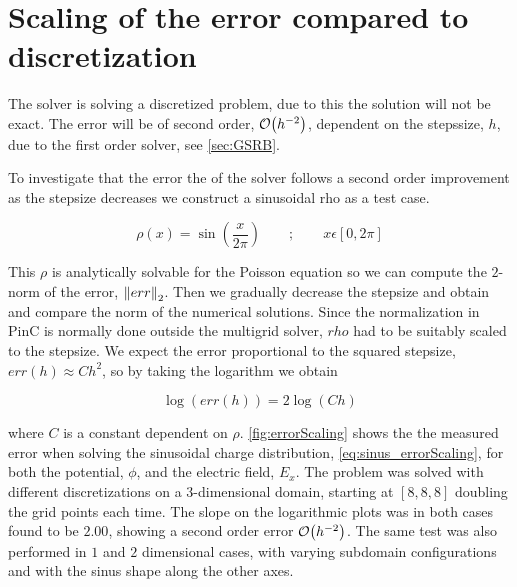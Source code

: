 \section{Scaling of the error compared to discretization}
The solver is solving a discretized problem, due to this the solution will not
be exact. The error will be of second order, \(\order{h^{-2}}\), dependent on the
stepssize, \(h\), due to the first order solver, see \cref{sec:GSRB}.


To investigate that the error the of the solver follows a second order improvement
as the stepsize decreases we construct a sinusoidal rho as a test case.

\begin{equation}
    \rho(x) = \sin{\left(\frac{x}{2\pi}\right)}      \qquad ; \qquad x\epsilon[0,2\pi] \label{eq:sinus_errorScaling}
\end{equation}

This \(\rho\) is analytically solvable for the Poisson equation so we can compute the
\(2\)-norm of the error, \(\norm{err}_2\). Then we gradually decrease the stepsize
and obtain and compare the norm of the numerical solutions. Since the normalization in PinC
is normally done outside the multigrid solver, \(rho\) had to be suitably scaled
to the stepsize. We expect the error proportional to the squared stepsize, \(err(h) \approx Ch^2\), so by taking the logarithm
we obtain

\begin{equation}
    \log(err(h)) = 2\log(Ch)
\end{equation}

where \(C\) is a constant dependent on \(\rho\). \cref{fig:errorScaling} shows the
the measured error when solving the sinusoidal charge distribution, \cref{eq:sinus_errorScaling},
for both the potential, \(\phi\), and the electric field, \(E_x\).
The problem was solved with different discretizations on a \(3\)-dimensional domain,
starting at \([8,8,8]\) doubling the grid points each time. The slope on the logarithmic plots
was in both cases found to be \(2.00\), showing a second order error \(\order{h^{-2}}\).
The same test was also performed in \(1\) and \(2\) dimensional cases, with varying
subdomain configurations and with the sinus shape along the other axes.

